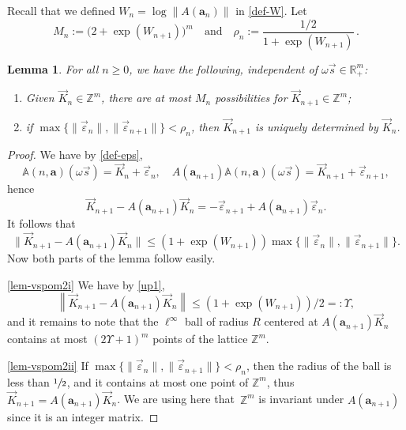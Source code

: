 \documentclass[11pt]{article}
\numberwithin{equation}{section}\newcommand{\Relation}[2][]{}\newtheorem*{prop*}{Proposition}
\newenvironment{enumeratei}
{\bgroup\def\theenumi{\roman{enumi}}\def\theenumii{\arabic{enumii}}\begin{enumerate}}
{\end{enumerate}\egroup}
\newcommand\shalf{\sfrac{1}{2}}
\theoremstyle{plain}
\newtheorem{lemma}[theorem]{Lemma}
\theoremstyle{definition}
\newcommand\bom{{\boldsymbol a}}\let\ba\bom
\let\eps\varepsilon
\let\om\omega
\newcommand\Aa{\mathbb{A}}
\newcommand{\R}{\mathbb{R}}
\newcommand{\Z}{\mathbb{Z}}
\newcommand\be{\begin{equation}}
\newcommand\ee{\end{equation}}
\begin{document}
Recall that we defined $W_n = \log\|A(\bom_n)\|$ in \eqref{def-W}.
Let
\be \label{def-Mn}
M_n:= \bigl(2+\exp(W_{n+1})\bigr)^m\quad \text{and}\quad \rho_n:= \frac{1/2}{1+\exp(W_{n+1})}\,.
\ee

\begin{lemma} \label{lem-vspom2}
For all $n\ge 0$, we have the following, independent of $\om\vec s\in \R_+^m$:
\begin{enumeratei}
\item\label{lem-vspom2i}
Given $\vec{K}_{n}\in\Z^m$, there are at most $M_n$ possibilities for $\vec K_{n+1}\in\Z^m$;

\item\label{lem-vspom2ii}
if $\max\{\|\vec\eps_{n}\|,\|\vec\eps_{{n+1}}\| \}< \rho_n$, then $\vec K_{{n+1}}$ is uniquely determined by $\vec K_{n}$.
\end{enumeratei}
\end{lemma}

\begin{proof}
We have by \eqref{def-eps},
\[
\Aa(n,\bom) (\om\vec s) = \vec{K}_n + \vec{\eps}_n,\quad A(\bom_{n+1}) \Aa(n,\bom) (\om\vec s) = \vec{K}_{n+1} + \vec{\eps}_{n+1},
\]
hence
\[
\vec{K}_{n+1} - A(\bom_{n+1})\vec{K}_n = -\vec{\eps}_{n+1} + A(\bom_{n+1})\vec{\eps}_n.
\]
It follows that
\[
\bigl\|\vec{K}_{n+1} - A(\bom_{n+1})\vec{K}_n\bigr\| \le (1 + \exp (W_{n+1}))\max\{\|\vec\eps_{n}\|,\|\vec\eps_{{n+1}}\|\}.
\]
Now both parts of the lemma follow easily.

\eqref{lem-vspom2i} We have by \eqref{up1},
\[
\left\|\vec{K}_{n+1} - A(\bom_{n+1})\vec{K}_n\right\| \le (1 + \exp (W_{n+1}))/2=:\Upsilon,
\]
and it remains to note that the $\ell^\infty$ ball of radius $R$ centered at $A(\bom_{n+1})\vec{K}_n$ contains at most $(2\Upsilon+1)^m$ points of the lattice $\Z^m$.

\eqref{lem-vspom2ii} If $\max\{\|\vec\eps_{n}\|,\|\vec\eps_{{n+1}}\|\}< \rho_n$, then the radius of the ball is less than $\shalf$, and it contains at most one point of $\Z^m$, thus $\vec{K}_{n+1} = A(\bom_{n+1})\vec{K}_n$. We are using here that~$\Z^m$ is invariant under $A(\bom_{n+1})$ since it is an integer matrix.
\end{proof}
\end{document}
